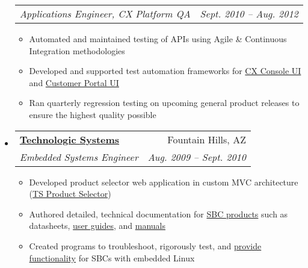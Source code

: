 \documentclass[letterpaper,11pt]{article}
\makeatletter
\newcommand{\resitem}[1]{\item #1 \vspace{-2pt}}
\newcommand{\ressubheading}[4]{
    \begin{tabular*}{6.5in}{l@{\extracolsep{\fill}}r}
      \textbf{#1} & #2 \\
      \textit{#3} & \textit{#4} \\
  \end{tabular*}\vspace{-6pt}}
\newcommand{\ressubsubheading}[2]{
    \begin{tabular*}{6.5in}{l@{\extracolsep{\fill}}r}
      \textit{#1} & \textit{#2} \\
  \end{tabular*}\vspace{-6pt}}
\makeatother
\begin{document}
\begin{itemize}
      \ressubsubheading{Applications Engineer, CX Platform QA}{Sept. 2010 -- Aug. 2012}
      { \footnotesize
	\begin{itemize}
	    \resitem{Automated and maintained testing of APIs using Agile \& Continuous Integration methodologies}
	    \resitem{Developed and supported test automation frameworks for \href{http://www.rightnow.com/resource-demo-desktop-workflow.php}{CX Console UI} and \href{http://www.oracle.com/us/products/applications/rightnow/web-experience/web-self-service/overview/index.html}{Customer Portal UI}}
	    \resitem{Ran quarterly regression testing on upcoming general product releases to ensure the highest quality possible}
	\end{itemize}
      }
      \begin{comment}
      \item			
	\ressubheading{Independent Contractor}{Bozeman, MT}{Computer Engineering Contractor}{Sept. 2010 -- Present}
	{ \footnotesize				
	  \begin{itemize}
	    \item \textbf{Clients:} Technologic Systems, S\&S Machine, Jares Fencing, Neumann Realty
	    \item Develop software and/or web applications to automate or enhance existing frameworks
	    \item Consult with clients to find best solutions and teach best practices
	    \item Maintain web presence, author documentation, and administrate online systems 
	  \end{itemize}
	}
      \end{comment}
    \item 
      \ressubheading{\href{http://www.embeddedarm.com}{Technologic Systems}}{Fountain Hills, AZ}{Embedded Systems Engineer}{Aug. 2009 -- Sept. 2010}
      { \footnotesize
	\begin{itemize}
	    \resitem{Developed product selector web application in custom MVC architecture (\href{http://embeddedarm.com/products/product-selector.php}{TS Product Selector})}
	    \resitem{Authored detailed, technical documentation for \href{http://www.embeddedarm.com/products/index.php}{SBC products} such as datasheets,  \href{http://www.embeddedarm.com/about/resource.php?item=410}{user guides}, and \href{http://www.embeddedarm.com/about/resource.php?item=409}{manuals}}
	    \resitem{Created programs to troubleshoot, rigorously test, and \href{ftp://ftp.embeddedarm.com/ts-arm-sbc/ts-7500-linux/samples/sbus.c}{provide functionality} for SBCs with embedded Linux}

\end{itemize}}
\end{itemize}
\end{document}
